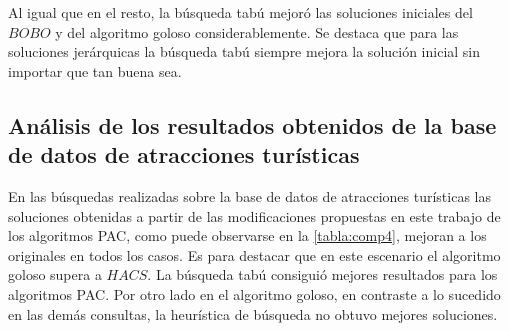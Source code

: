 Al igual que en el resto, la búsqueda tabú mejoró las soluciones iniciales del $BOBO$ y del algoritmo goloso considerablemente. Se destaca que para las soluciones jerárquicas la búsqueda tabú siempre mejora la solución inicial sin importar que tan buena sea.
\begin{table}[H]
\begin{center}
\caption{Comparación de calidad de soluciones entre algoritmos para la \hyperref[busqueda:universidades]{búsqueda de universidades}} 
\end{center}
\end{table}

\subsection{Análisis de los resultados obtenidos de la base de datos de atracciones turísticas}\label{res:busAtracciones}
En las búsquedas realizadas sobre la base de datos de atracciones turísticas las soluciones obtenidas a partir de las modificaciones propuestas en este trabajo de los algoritmos PAC, como puede observarse en la \autoref{tabla:comp4}, mejoran a los originales en todos los casos. Es para destacar que en este escenario el algoritmo goloso supera a $HACS$. La búsqueda tabú consiguió mejores resultados para los algoritmos PAC. Por otro lado en el algoritmo goloso, en contraste a lo sucedido en las demás consultas, la heurística de búsqueda no obtuvo mejores soluciones.

